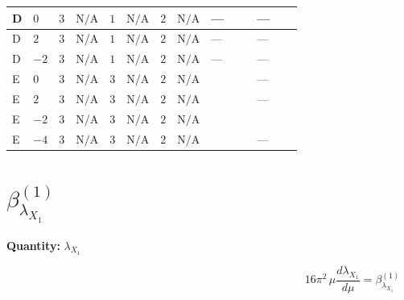 \documentclass[8pt]{article}
\begin{document}
\begin{landscape}
\begin{longtable}{@{}llcccccc >{\raggedright\arraybackslash}p{0.21\linewidth} >{\raggedright\arraybackslash}p{0.21\linewidth}@{}}
\midrule
D & $0$ & $3$ & $\text{N/A}$ & $1$ & $\text{N/A}$ & $2$ & $\text{N/A}$ & --- & --- \\
\midrule
D & $2$ & $3$ & $\text{N/A}$ & $1$ & $\text{N/A}$ & $2$ & $\text{N/A}$ & --- & --- \\
\midrule
D & $-2$ & $3$ & $\text{N/A}$ & $1$ & $\text{N/A}$ & $2$ & $\text{N/A}$ & --- & --- \\
\midrule
E & $0$ & $3$ & $\text{N/A}$ & $3$ & $\text{N/A}$ & $2$ & $\text{N/A}$ & \scriptsize\adjustbox{max width=\linewidth}{$\begin{gathered} -\frac{4 {\lambda_{12}^{(\times)}}^2}{3}\end{gathered}$} & --- \\
\midrule
E & $2$ & $3$ & $\text{N/A}$ & $3$ & $\text{N/A}$ & $2$ & $\text{N/A}$ & \scriptsize\adjustbox{max width=\linewidth}{$\begin{gathered} -\frac{4 {\lambda_{12}^{(\times)}}^2}{3}\end{gathered}$} & --- \\
\midrule
E & $-2$ & $3$ & $\text{N/A}$ & $3$ & $\text{N/A}$ & $2$ & $\text{N/A}$ & \scriptsize\adjustbox{max width=\linewidth}{$\begin{gathered} -\frac{4 {\lambda_{12}^{(\times)}}^2}{3}\end{gathered}$} & \scriptsize\adjustbox{max width=\linewidth}{$\begin{gathered} -\frac{4}{3} {\lambda_{X_{7}}^{(1)}} (3 \left({\lambda_{X_{7}}^{(1)}}\right)^{*}+\left({\lambda_{X_{7}}^{(2)}}\right)^{*})\end{gathered}$} \\
\midrule
E & $-4$ & $3$ & $\text{N/A}$ & $3$ & $\text{N/A}$ & $2$ & $\text{N/A}$ & \scriptsize\adjustbox{max width=\linewidth}{$\begin{gathered} -\frac{4 {\lambda_{12}^{(\times)}}^2}{3}\end{gathered}$} & --- \\
\midrule
\bottomrule
\end{longtable}
\clearpage
\section*{$\beta_{{\lambda_{X_{1}}}}^{(1)}$}
\noindent\textbf{Quantity: }${\lambda_{X_{1}}}$\par\smallskip
\[16\pi^2\,\mu\frac{d {\lambda_{X_{1}}}}{d\mu}=\beta_{{\lambda_{X_{1}}}}^{(1)}\]

\end{landscape}
\end{document}
